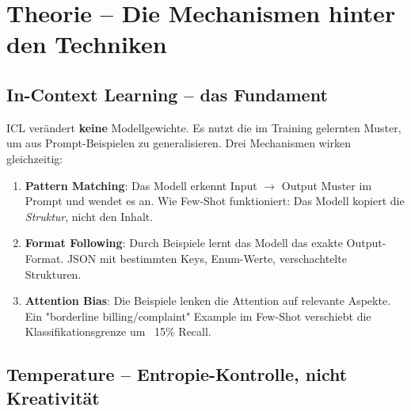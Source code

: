 
\section{Theorie -- Die Mechanismen hinter den Techniken}


\subsection{In-Context Learning -- das Fundament}

ICL verändert \textbf{keine} Modellgewichte. Es nutzt die im Training gelernten Muster, um aus Prompt-Beispielen zu generalisieren. Drei Mechanismen wirken gleichzeitig:

\begin{enumerate}
    \item \textbf{Pattern Matching}: Das Modell erkennt Input $\rightarrow$ Output Muster im Prompt und wendet es an. Wie Few-Shot funktioniert: Das Modell kopiert die \textit{Struktur}, nicht den Inhalt.
    \item \textbf{Format Following}: Durch Beispiele lernt das Modell das exakte Output-Format. JSON mit bestimmten Keys, Enum-Werte, verschachtelte Strukturen. 
    \item \textbf{Attention Bias}: Die Beispiele lenken die Attention auf relevante Aspekte. Ein "borderline billing/complaint" Example im Few-Shot verschiebt die Klassifikationsgrenze um ~15\% Recall.
\end{enumerate}

\subsection{Temperature -- Entropie-Kontrolle, nicht Kreativität}

